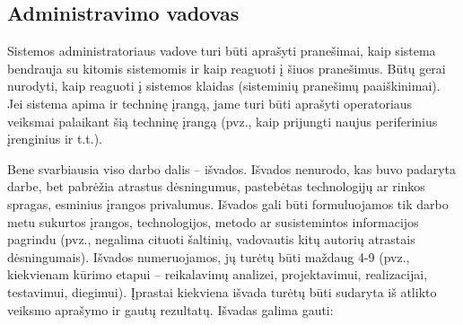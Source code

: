 \documentclass{ktuthesis}
\begin{document}
	\subsection{Administravimo vadovas}
	
	Sistemos administratoriaus vadove turi būti aprašyti pranešimai, kaip sistema bendrauja su kitomis sistemomis ir kaip reaguoti į šiuos pranešimus.
	Būtų gerai nurodyti, kaip reaguoti į sistemos klaidas (sisteminių pranešimų paaiškinimai). Jei sistema apima ir techninę įrangą, jame turi būti
	aprašyti operatoriaus veiksmai palaikant šią techninę įrangą (pvz., kaip prijungti naujus periferinius įrenginius ir t.t.).
	
	\newpage
	
	
	Bene svarbiausia viso darbo dalis – išvados. Išvados nenurodo, kas buvo padaryta darbe, bet pabrėžia atrastus dėsningumus, pastebėtas technologijų
	ar rinkos spragas, esminius įrangos privalumus. Išvados gali būti formuluojamos tik darbo metu sukurtos įrangos, technologijos, metodo ar susistemintos
	informacijos pagrindu (pvz., negalima cituoti šaltinių, vadovautis kitų autorių atrastais dėsningumais).
	Išvados numeruojamos, jų turėtų būti maždaug 4-9 (pvz., kiekvienam kūrimo etapui – reikalavimų analizei, projektavimui, realizacijai, testavimui, diegimui).
	Įprastai kiekviena išvada turėtų būti sudaryta iš atlikto veiksmo aprašymo ir gautų rezultatų. Išvadas galima gauti:
\end{document}
